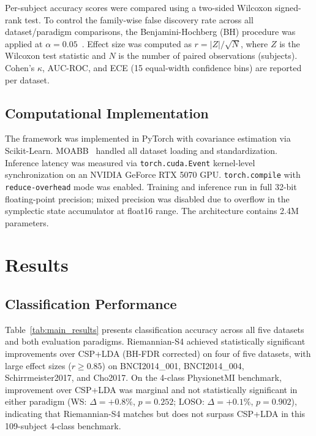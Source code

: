 \documentclass[11pt,a4paper]{article}
\begin{document}
Per-subject accuracy scores were compared using a two-sided Wilcoxon
signed-rank test.
To control the family-wise false discovery rate across all
dataset/paradigm comparisons, the Benjamini-Hochberg (BH) procedure was applied
at $\alpha = 0.05$~\cite{Benjamini1995}.
Effect size was computed as $r = |Z|/\sqrt{N}$, where $Z$ is the Wilcoxon
test statistic and $N$ is the number of paired observations (subjects).
Cohen's $\kappa$, AUC-ROC, and ECE (15 equal-width confidence bins) are
reported per dataset.

\subsection{Computational Implementation}

The framework was implemented in PyTorch with covariance estimation via
Scikit-Learn.
MOABB~\cite{Jayaram2018} handled all dataset loading and standardization.
Inference latency was measured via \texttt{torch.cuda.Event} kernel-level
synchronization on an NVIDIA GeForce RTX 5070 GPU.
\texttt{torch.compile} with \texttt{reduce-overhead} mode was enabled.
Training and inference run in full 32-bit floating-point precision; mixed
precision was disabled due to overflow in the symplectic state accumulator
at float16 range.
The architecture contains 2.4M parameters.

\section{Results}

\subsection{Classification Performance}

Table~\ref{tab:main_results} presents classification accuracy across all five
datasets and both evaluation paradigms.
Riemannian-S4 achieved statistically significant improvements over CSP+LDA
(BH-FDR corrected) on four of five datasets, with large effect sizes
($r \geq 0.85$) on BNCI2014\_001, BNCI2014\_004, Schirrmeister2017, and
Cho2017.
On the 4-class PhysionetMI benchmark, improvement over CSP+LDA was marginal
and not statistically significant in either paradigm
(WS: $\Delta = +0.8\%$, $p = 0.252$;
LOSO: $\Delta = +0.1\%$, $p = 0.902$), indicating that Riemannian-S4 matches
but does not surpass CSP+LDA in this 109-subject 4-class benchmark.
\end{document}
